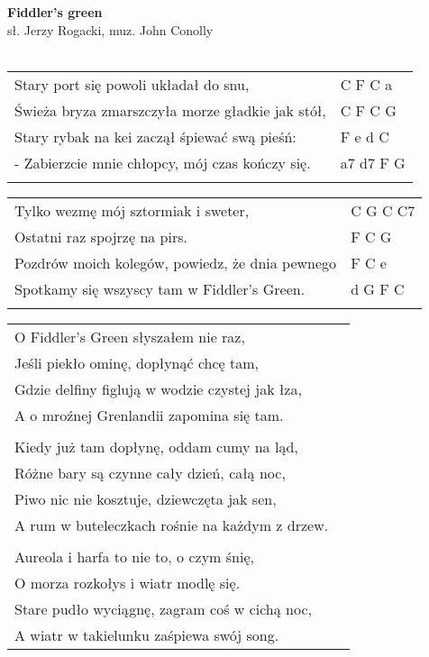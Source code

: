 \documentclass[a5paper]{article}
\begin{document}


\noindent
\fontsize{12pt}{15pt}\selectfont
\textbf{Fiddler's green} \\
\fontsize{8pt}{10pt}\selectfont
sł. Jerzy Rogacki, muz. John Conolly \\ \\
\fontsize{10pt}{12pt}\selectfont
{}
\begin{tabular}{@{}p{9.00cm}p{3cm}@{}}
\noindent
Stary port się powoli układał do snu, & C F C a \\
Świeża bryza zmarszczyła morze gładkie jak stół, & C F C G  \\
Stary rybak na kei zaczął śpiewać swą pieśń: & F e d C \\
- Zabierzcie mnie chłopcy, mój czas kończy się. & a7 d7 F G \\ \\
\end{tabular}

\noindent
\begin{tabular}{@{}p{8.00cm}p{3cm}@{}}
Tylko wezmę mój sztormiak i sweter, & C G C C7 \\
Ostatni raz spojrzę na pirs. & F C G \\
Pozdrów moich kolegów, powiedz, że dnia pewnego & F C e \\
Spotkamy się wszyscy tam w Fiddler's Green. & d G F C \\ \\
\end{tabular}

\noindent
\begin{tabular}{@{}p{8.00cm}p{3cm}@{}}
O Fiddler's Green słyszałem nie raz,  \\
Jeśli piekło ominę, dopłynąć chcę tam, \\
Gdzie delfiny figlują w wodzie czystej jak łza, \\
A o mroźnej Grenlandii zapomina się tam. \\ \\

Kiedy już tam dopłynę, oddam cumy na ląd, \\
Różne bary są czynne cały dzień, całą noc, \\
Piwo nic nie kosztuje, dziewczęta jak sen, \\
A rum w buteleczkach rośnie na każdym z drzew. \\ \\

Aureola i harfa to nie to, o czym śnię, \\
O morza rozkołys i wiatr modlę się. \\
Stare pudło wyciągnę, zagram coś w cichą noc, \\
A wiatr w takielunku zaśpiewa swój song.
\end{tabular}
\end{document}
